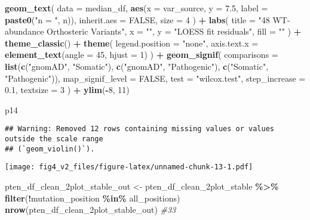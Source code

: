 \documentclass[
]{article}
\newenvironment{Shaded}{\begin{snugshade}}{\end{snugshade}}
\newcommand{\AttributeTok}[1]{\textcolor[rgb]{0.13,0.29,0.53}{#1}}
\newcommand{\CommentTok}[1]{\textcolor[rgb]{0.56,0.35,0.01}{\textit{#1}}}
\newcommand{\ConstantTok}[1]{\textcolor[rgb]{0.56,0.35,0.01}{#1}}
\newcommand{\DecValTok}[1]{\textcolor[rgb]{0.00,0.00,0.81}{#1}}
\newcommand{\FloatTok}[1]{\textcolor[rgb]{0.00,0.00,0.81}{#1}}
\newcommand{\FunctionTok}[1]{\textcolor[rgb]{0.13,0.29,0.53}{\textbf{#1}}}
\newcommand{\NormalTok}[1]{#1}
\newcommand{\OtherTok}[1]{\textcolor[rgb]{0.56,0.35,0.01}{#1}}
\newcommand{\SpecialCharTok}[1]{\textcolor[rgb]{0.81,0.36,0.00}{\textbf{#1}}}
\newcommand{\StringTok}[1]{\textcolor[rgb]{0.31,0.60,0.02}{#1}}
\begin{document}
\begin{Shaded}
\begin{Highlighting}[]
  \FunctionTok{geom\_text}\NormalTok{(}
    \AttributeTok{data =}\NormalTok{ median\_df,}
    \FunctionTok{aes}\NormalTok{(}\AttributeTok{x =}\NormalTok{ var\_source, }\AttributeTok{y =} \FloatTok{7.5}\NormalTok{, }\AttributeTok{label =} \FunctionTok{paste0}\NormalTok{(}\StringTok{"n = "}\NormalTok{, n)),}
    \AttributeTok{inherit.aes =} \ConstantTok{FALSE}\NormalTok{,}
    \AttributeTok{size =} \DecValTok{4}
\NormalTok{  ) }\SpecialCharTok{+}
  \FunctionTok{labs}\NormalTok{(}
    \AttributeTok{title =} \StringTok{"48 WT{-}abundance Orthosteric Variants"}\NormalTok{,}
    \AttributeTok{x =} \StringTok{""}\NormalTok{,}
    \AttributeTok{y =} \StringTok{"LOESS fit residuals"}\NormalTok{,}
    \AttributeTok{fill =} \StringTok{""}
\NormalTok{  ) }\SpecialCharTok{+}
  \FunctionTok{theme\_classic}\NormalTok{() }\SpecialCharTok{+}
  \FunctionTok{theme}\NormalTok{(}
    \AttributeTok{legend.position =} \StringTok{"none"}\NormalTok{,}
    \AttributeTok{axis.text.x =} \FunctionTok{element\_text}\NormalTok{(}\AttributeTok{angle =} \DecValTok{45}\NormalTok{, }\AttributeTok{hjust =} \DecValTok{1}\NormalTok{)}
\NormalTok{  ) }\SpecialCharTok{+}
  \FunctionTok{geom\_signif}\NormalTok{(}
    \AttributeTok{comparisons =} \FunctionTok{list}\NormalTok{(}\FunctionTok{c}\NormalTok{(}\StringTok{"gnomAD"}\NormalTok{, }\StringTok{"Somatic"}\NormalTok{), }
                       \FunctionTok{c}\NormalTok{(}\StringTok{"gnomAD"}\NormalTok{, }\StringTok{"Pathogenic"}\NormalTok{), }
                       \FunctionTok{c}\NormalTok{(}\StringTok{"Somatic"}\NormalTok{, }\StringTok{"Pathogenic"}\NormalTok{)),}
    \AttributeTok{map\_signif\_level =} \ConstantTok{FALSE}\NormalTok{,}
    \AttributeTok{test =} \StringTok{"wilcox.test"}\NormalTok{,}
    \AttributeTok{step\_increase =} \FloatTok{0.1}\NormalTok{,}
    \AttributeTok{textsize =} \DecValTok{3}
\NormalTok{  ) }\SpecialCharTok{+} \FunctionTok{ylim}\NormalTok{(}\SpecialCharTok{{-}}\DecValTok{8}\NormalTok{, }\DecValTok{11}\NormalTok{)}

\NormalTok{p14}
\end{Highlighting}
\end{Shaded}

\begin{verbatim}
## Warning: Removed 12 rows containing missing values or values outside the scale range
## (`geom_violin()`).
\end{verbatim}

\texttt{[image: fig4\_v2\_files/figure-latex/unnamed-chunk-13-1.pdf]}

\begin{Shaded}
\begin{Highlighting}[]
\NormalTok{pten\_df\_clean\_2plot\_stable\_out }\OtherTok{\textless{}{-}}\NormalTok{ pten\_df\_clean\_2plot\_stable }\SpecialCharTok{\%\textgreater{}\%} \FunctionTok{filter}\NormalTok{(}\SpecialCharTok{!}\NormalTok{mutation\_position }\SpecialCharTok{\%in\%}\NormalTok{ all\_positions)}
\FunctionTok{nrow}\NormalTok{(pten\_df\_clean\_2plot\_stable\_out) }\CommentTok{\#33}
\end{Highlighting}
\end{Shaded}
\end{document}
